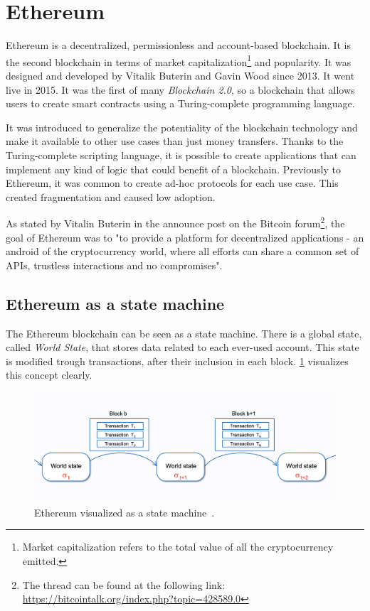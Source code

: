 \section{Ethereum}

Ethereum is a decentralized, permissionless and account-based blockchain. It is the second blockchain in terms of market capitalization\footnote{Market capitalization refers to the total value of all the cryptocurrency emitted.} and popularity. It was designed and developed by Vitalik Buterin and Gavin Wood since 2013. It went live in 2015. It was the first of many \textit{Blockchain 2.0}, so a blockchain that allows users to create smart contracts using a Turing-complete programming language.

It was introduced to generalize the potentiality of the blockchain technology and make it available to other use cases than just money transfers. Thanks to the Turing-complete scripting language, it is possible to create applications that can implement any kind of logic that could benefit of a blockchain. Previously to Ethereum, it was common to create ad-hoc protocols for each use case. This created fragmentation and caused low adoption. 

As stated by Vitalin Buterin in the announce post on the Bitcoin forum\footnote{The thread can be found at the following link: \url{https://bitcointalk.org/index.php?topic=428589.0}}, the goal of Ethereum was to "to provide a platform for decentralized applications - an android of the cryptocurrency world, where all efforts can share a common set of APIs, trustless interactions and no compromises". 

\subsection{Ethereum as a state machine}

The Ethereum blockchain can be seen as a state machine. There is a global state, called \textit{World State}, that stores data related to each ever-used account. This state is modified trough transactions, after their inclusion in each block. \cref{fig:ethereum-state-machine} visualizes this concept clearly.

\begin{figure}[H]
    \centering
    \includegraphics[width=1\textwidth]{Figures/background/state-machine.png}
    \caption{Ethereum visualized as a state machine~\cite{evm-illustrated}.}
    \label{fig:ethereum-state-machine}
\end{figure}

